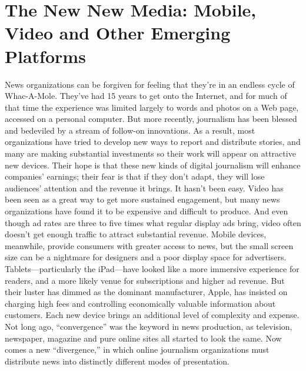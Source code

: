 \chapter{The New New Media: Mobile, Video and Other Emerging Platforms}
News organizations can be forgiven for feeling that they're in an endless cycle
of Whac-A-Mole.
They've had 15 years to get onto the Internet, and for much of that time the
experience was limited largely to words and photos on a Web page, accessed on
a personal computer. But more recently, journalism has been blessed and bedeviled
by a stream of follow-on innovations. As a result, most organizations have
tried to develop new ways to report and distribute stories, and many are making
substantial investments so their work will appear on attractive new devices. Their
hope is that these new kinds of digital journalism will enhance companies' earnings;
their fear is that if they don't adapt, they will lose audiences' attention and
the revenue it brings.
It hasn't been easy. Video has been seen as a great way to get more sustained
engagement, but many news organizations have found it to be expensive and difficult
to produce. And even though ad rates are three to five times what regular
display ads bring, video often doesn't get enough traffic to attract substantial revenue.
Mobile devices, meanwhile, provide consumers with greater access to news,
but the small screen size can be a nightmare for designers and a poor display space
for advertisers. Tablets—particularly the iPad—have looked like a more immersive
experience for readers, and a more likely venue for subscriptions and higher
ad revenue. But their luster has dimmed as the dominant manufacturer, Apple, has
insisted on charging high fees and controlling economically valuable information
about customers. Each new device brings an additional level of complexity and
expense. Not long ago, ``convergence'' was the keyword in news production, as
television, newspaper, magazine and pure online sites all started to look the same.
Now comes a new ``divergence,'' in which online journalism organizations must
distribute news into distinctly different modes of presentation.

